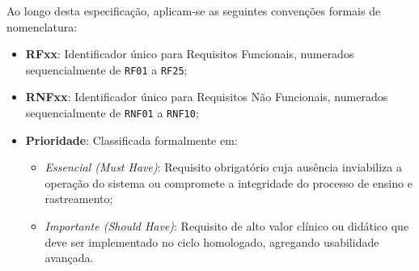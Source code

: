 Ao longo desta especificação, aplicam-se as seguintes convenções formais de nomenclatura:
\begin{itemize}
    \item \textbf{RFxx}: Identificador único para Requisitos Funcionais, numerados sequencialmente de \texttt{RF01} a \texttt{RF25};
    \item \textbf{RNFxx}: Identificador único para Requisitos Não Funcionais, numerados sequencialmente de \texttt{RNF01} a \texttt{RNF10};
    \item \textbf{Prioridade}: Classificada formalmente em:
    \begin{itemize}
        \item \textit{Essencial (Must Have)}: Requisito obrigatório cuja ausência inviabiliza a operação do sistema ou compromete a integridade do processo de ensino e rastreamento;
        \item \textit{Importante (Should Have)}: Requisito de alto valor clínico ou didático que deve ser implementado no ciclo homologado, agregando usabilidade avançada.
    \end{itemize}
\end{itemize}

